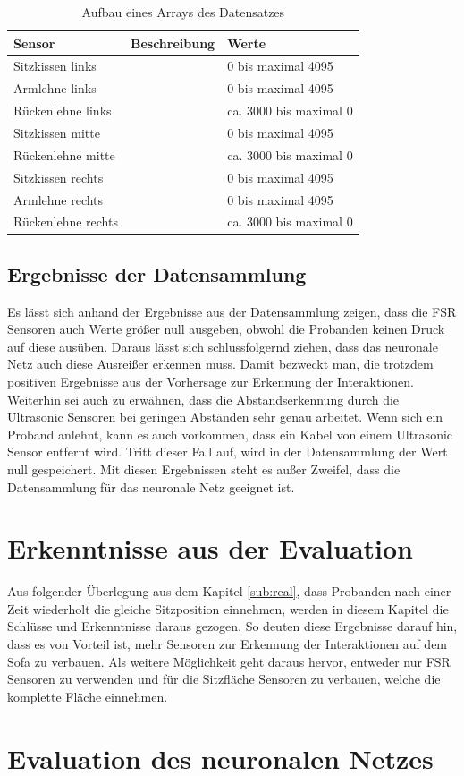 \begin{table}[ht]
	\centering
	\caption[Aufbau eines Arrays des Datensatzes]{Aufbau eines Arrays des Datensatzes}
		\vspace{1.0em}	
	\begin{tabular}{| l | p{5cm} | l | }
		\hline
		\rowcolor[gray]{0.9}\textbf{Sensor} & \textbf{Beschreibung} & \textbf{Werte} \\
		\hline
		\hline
		Sitzkissen links &  & 0 bis maximal 4095\\
		\hline
		Armlehne links & & 0 bis maximal 4095\\
		\hline
		Rückenlehne links & & ca. 3000 bis maximal 0 \\
		\hline
		Sitzkissen mitte & & 0 bis maximal 4095\\
		\hline
		Rückenlehne mitte & & ca. 3000 bis maximal 0\\
		\hline
		Sitzkissen rechts & & 0 bis maximal 4095\\
		\hline
		Armlehne rechts & & 0 bis maximal 4095\\
		\hline
		Rückenlehne rechts & & ca. 3000 bis maximal 0\\ 
		\hline
	\end{tabular}
	\label{tab:tableqos}
\end{table}

\subsection{Ergebnisse der Datensammlung}
Es lässt sich anhand der Ergebnisse aus der Datensammlung zeigen, dass die FSR Sensoren auch Werte größer null ausgeben, obwohl die Probanden keinen Druck auf diese ausüben. Daraus lässt sich schlussfolgernd ziehen, dass das neuronale Netz auch diese Ausreißer erkennen muss. Damit bezweckt man, die trotzdem positiven Ergebnisse aus der Vorhersage zur Erkennung der Interaktionen. Weiterhin sei auch zu erwähnen, dass die Abstandserkennung durch die Ultrasonic Sensoren bei geringen Abständen sehr genau arbeitet. Wenn sich ein Proband anlehnt, kann es auch vorkommen, dass ein Kabel von einem Ultrasonic Sensor entfernt wird. Tritt dieser Fall auf, wird in der Datensammlung der Wert null gespeichert. Mit diesen Ergebnissen steht es außer Zweifel, dass die Datensammlung für das neuronale Netz geeignet ist. 

\section{Erkenntnisse aus der Evaluation}
Aus folgender Überlegung aus dem Kapitel \ref{sub:real}, dass Probanden nach einer Zeit wiederholt die gleiche Sitzposition einnehmen, werden in diesem Kapitel die Schlüsse und Erkenntnisse daraus gezogen.
So deuten diese Ergebnisse darauf hin, dass es von Vorteil ist, mehr Sensoren zur Erkennung der Interaktionen auf dem Sofa zu verbauen. Als weitere Möglichkeit geht daraus hervor, entweder nur FSR Sensoren zu verwenden und für die Sitzfläche Sensoren zu verbauen, welche die komplette Fläche einnehmen.

\section{Evaluation des neuronalen Netzes}
\label{cha:eval_NN}
